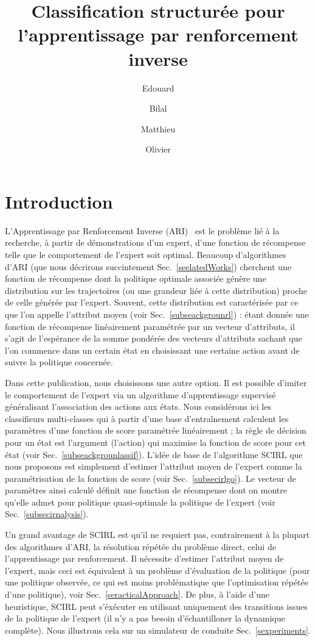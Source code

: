 \documentclass[french,utf8]{./hermes-journal}
\title[SCIRL]{Classification structurée pour l'apprentissage par renforcement inverse}
\author[1,2]{Edouard}{Klein}
\author[2,3]{Bilal}{Piot}
\author[2]{Matthieu}{Geist}
\author[2,3]{Olivier}{Pietquin}
\begin{document}
\maketitle

\newpage
\section{Introduction}
\label{sentro}

L'Apprentissage par Renforcement Inverse (ARI)~\cite{Russel998} est le problème lié à la recherche, à partir de démonstrations d'un expert, d'une fonction de récompense telle que le comportement de l'expert soit optimal. Beaucoup d'algorithmes d'ARI (que nous décrirons succintement Sec.~\ref{seelatedWorks}) cherchent une fonction de récompense dont la politique optimale associée génère une distribution sur les trajectoires (ou une grandeur liée à cette distribution) proche de celle générée par l'expert. Souvent, cette distribution est caractérisée par ce que l'on appelle l'attribut moyen (voir Sec.~\ref{subseackgrounrl}) : étant donnée une fonction de récompense linéairement paramétrée par un vecteur d'attributs, il s'agit de l'espérance de la somme pondérée des vecteurs d'attributs sachant que l'on commence dans un certain état en choisissant une certaine action avant de suivre la politique concernée.

Dans cette publication, nous choisissons une autre option. Il est possible d'imiter le comportement de l'expert via un algorithme d'apprentissage supervisé généralisant l'association des actions aux états. Nous considérons ici les classifieurs multi-classes qui à partir d'une base d'entraînement calculent les paramètres d'une fonction de score paramétrée linéairement ; la règle de décision pour un état est l'argument (l'action) qui maximise la fonction de score pour cet état (voir Sec.~\ref{subseackgrounlassif}). L'idée de base de l'algorithme SCIRL que nous proposons est simplement d'estimer l'attribut moyen de l'expert comme la paramétrisation de la fonction de score (voir Sec.~\ref{subsecirlgo}). Le vecteur de paramètres ainsi calculé définit une fonction de récompense dont on montre qu'elle admet pour politique quasi-optimale la politique de l'expert (voir Sec.~\ref{subsecirnalysis}).

Un grand avantage de SCIRL est qu'il ne requiert pas, contrairement à la plupart des algorithmes d'ARI, la résolution répétée du problème direct, celui de l'apprentissage par renforcement. Il nécessite d'estimer l'attribut moyen de l'expert, mais ceci est équivalent à un problème d'évaluation de la politique (pour une politique observée, ce qui est moins problématique que l'optimisation répétée d'une politique), voir Sec.~\ref{seracticalApproach}.
De plus, à l'aide d'une heuristique, SCIRL peut s'éxécuter en utilisant uniquement des transitions issues de la politique de l'expert (il n'y a pas besoin d'échantilloner la dynamique complète). Nous illustrons cela sur un simulateur de conduite Sec.~\ref{sexperiments}.
\end{document}
